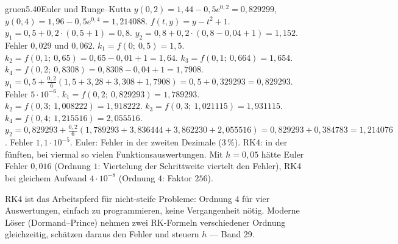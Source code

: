 \begin{loesungkarte}{gruen}{5.40}{Euler und Runge--Kutta}
$y(0{,}2) = 1{,}44 - 0{,}5e^{0{,}2} = 0{,}829299$, $y(0{,}4) = 1{,}96 - 0{,}5e^{0{,}4} = 1{,}214088$.
$f(t, y) = y - t^{2} + 1$. $y_1 = 0{,}5 + 0{,}2\cdot(0{,}5 + 1) = 0{,}8$. $y_2 = 0{,}8 + 0{,}2\cdot(0{,}8 - 0{,}04 + 1) = 1{,}152$. Fehler $0{,}029$ und $0{,}062$.
$k_1 = f(0;\ 0{,}5) = 1{,}5$. $k_2 = f(0{,}1;\ 0{,}65) = 0{,}65 - 0{,}01 + 1 = 1{,}64$. $k_3 = f(0{,}1;\ 0{,}664) = 1{,}654$. $k_4 = f(0{,}2;\ 0{,}8308) = 0{,}8308 - 0{,}04 + 1 = 1{,}7908$. $y_1 = 0{,}5 + \frac{0{,}2}6(1{,}5 + 3{,}28 + 3{,}308 + 1{,}7908) = 0{,}5 + 0{,}329293 = 0{,}829293$. Fehler $5\cdot10^{-6}$.
$k_1 = f(0{,}2;\ 0{,}829293) = 1{,}789293$. $k_2 = f(0{,}3;\ 1{,}008222) = 1{,}918222$. $k_3 = f(0{,}3;\ 1{,}021115) = 1{,}931115$. $k_4 = f(0{,}4;\ 1{,}215516) = 2{,}055516$. $y_2 = 0{,}829293 + \frac{0{,}2}6(1{,}789293 + 3{,}836444 + 3{,}862230 + 2{,}055516) = 0{,}829293 + 0{,}384783 = 1{,}214076$. Fehler $1{,}1\cdot10^{-5}$.
Euler: Fehler in der zweiten Dezimale ($3\,\%$). RK4: in der fünften, bei viermal so vielen Funktionsauswertungen. Mit $h = 0{,}05$ hätte Euler Fehler $0{,}016$ (Ordnung $1$: Viertelung der Schrittweite viertelt den Fehler), RK4 bei gleichem Aufwand $4\cdot10^{-8}$ (Ordnung $4$: Faktor $256$).
\begin{mitnehmen}\kastentext
RK4 ist das Arbeitspferd für nicht-steife Probleme: Ordnung $4$ für vier Auswertungen, einfach zu programmieren, keine Vergangenheit nötig. Moderne Löser (Dormand--Prince) nehmen zwei RK-Formeln verschiedener Ordnung gleichzeitig, schätzen daraus den Fehler und steuern $h$ --- Band 29.
\end{mitnehmen}
\end{loesungkarte}

